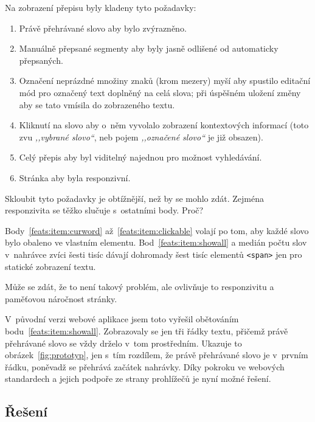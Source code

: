 Na zobrazení přepisu byly kladeny tyto požadavky:
\begin{enumerate}
\item{
    Právě přehrávané slovo aby bylo zvýrazněno.
    \label{feats:item:curword}
}
\item{
    Manuálně přepsané segmenty aby byly jasně odlišené od automaticky
    přepsaných.
    \label{feats:item:manualdistinct}
}
\item{
    Označení neprázdné množiny znaků (krom mezery) myší aby spustilo editační
    mód pro označený text doplněný na celá slova;
    při úspěšném uložení změny aby se tato vmísila do zobrazeného textu.
    \label{feats:item:selectable}
}
\item{
    Kliknutí na slovo aby o~něm vyvolalo zobrazení kontextových informací
    (toto zvu {\em ,,vybrané slovo``}, neb pojem {\em ,,označené slovo``} je již
    obsazen).
    \label{feats:item:clickable}
}
\item{
    Celý přepis aby byl viditelný najednou pro možnost vyhledávání.
    \label{feats:item:showall}
}
\item{
    Stránka aby byla responzivní.
    \label{feats:item:speed}
}
\end{enumerate}

Skloubit tyto požadavky je obtížnější, než by se mohlo zdát. Zejména
responzivita se těžko slučuje s~ostatními body. Proč?

Body~\ref{feats:item:curword} až~\ref{feats:item:clickable} volají po tom, aby
každé slovo bylo obaleno ve vlastním elementu.
Bod~\ref{feats:item:showall} a medián počtu slov v~nahrávce zvíci šesti tisíc
dávají dohromady šest tisíc elementů \texttt{<span>} jen pro statické zobrazení
textu.

Může se zdát, že to není takový problém, ale ovlivňuje to responzivitu a
paměťovou náročnost stránky.

V~původní verzi webové aplikace jsem toto vyřešil obětováním
bodu~\ref{feats:item:showall}. Zobrazovaly se jen tři řádky textu, přičemž právě
přehrávané slovo se vždy drželo v~tom prostředním. Ukazuje to
obrázek~\ref{fig:prototyp}, jen s~tím rozdílem, že právě přehrávané slovo je v~prvním
řádku, poněvadž se přehrává začátek nahrávky. Díky pokroku ve webových
standardech a jejich podpoře ze strany prohlížečů je nyní možné řešení.

\subsection{Řešení}

